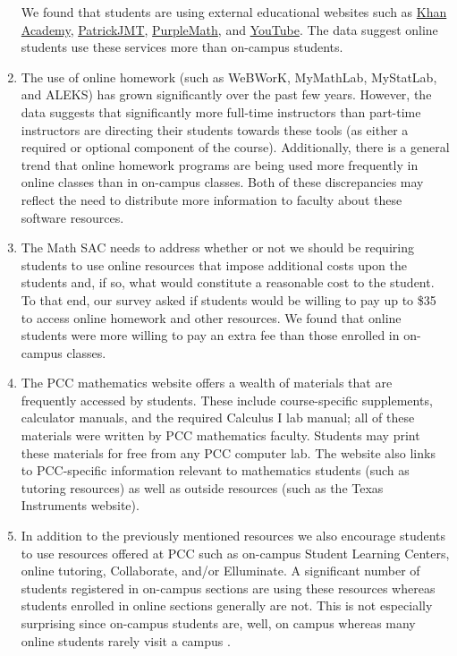\begin{enumerate}[label=Q\arabic*.,font=\bf]
	We found that students are using external educational websites such as
	\href{https://www.khanacademy.org/}{Khan Academy},
	\href{http://patrickjmt.com/}{PatrickJMT},
	\href{http://www.purplemath.com/}{PurpleMath}, and
	\href{http://www.youtube.com/}{YouTube}.  The data suggest online
	students use these services more than on-campus students.
	\item The use of online homework (such as WeBWorK,  MyMathLab, MyStatLab, and
	ALEKS) has grown significantly over the past few years. However, the data
	suggests that significantly more full-time instructors than part-time
	instructors are directing their students towards these tools (as either a
	required or optional component of the course).  Additionally, there is a
	general trend that online homework programs are being used more frequently
	in online classes than in on-campus classes.  Both of these discrepancies
	may reflect the need to distribute more information to faculty about these
	software resources.
	\item The Math SAC needs to address whether or not we should be requiring
	students to use online resources that impose additional costs upon the
	students and, if so, what would constitute a reasonable cost to the
	student.  To that end, our survey asked if students would be willing to pay
	up to \$35 to access online homework and other resources.   We found that
	online students were more willing to pay an extra fee than those enrolled
	in on-campus classes.
	\setcounter{enumi}{6}
	\item The PCC mathematics website offers a wealth of materials that are
	frequently accessed by students. These include course-specific supplements,
	calculator manuals, and the required Calculus I lab manual; all of these
	materials were written by PCC mathematics faculty.  Students may print
	these materials for free from any PCC computer lab. The website also links
	to PCC-specific information relevant to mathematics students (such as
	tutoring resources) as well as outside resources (such as the Texas
	Instruments website).
	\setcounter{enumi}{8}
	\item In addition to the previously mentioned resources we also encourage
	students to use resources offered at PCC such as on-campus Student Learning
	Centers, online tutoring, Collaborate, and/or Elluminate. A significant
	number of students registered in on-campus sections are using these
	resources whereas students enrolled in online sections generally are not.
	This is not especially surprising since on-campus students are, well, on
	campus whereas many online students rarely visit a campus .
\end{enumerate}

